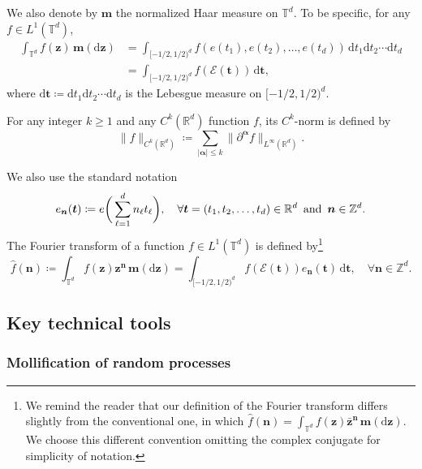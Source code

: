 \documentclass[12pt]{amsart}
\theoremstyle{definition}
\theoremstyle{remark}
\newcommand{\bt}{\boldsymbol{t}}
\newcommand{\bz}{\boldsymbol{z}}
\newcommand{\R}{\mathbb{R}}
\newcommand{\Z}{\mathbb{Z}}
\newcommand{\T}{\mathbb{T}}
\newcommand{\an}{\text{\, and \,}}
\numberwithin{equation}{section}
\begin{document}
We also denote by  $\boldsymbol{m}$ the normalized Haar measure on $\T^d$. To be specific, for any $f\in L^1(\T^d)$,
\begin{align*}
\int_{\T^d} f(\bz)\,\boldsymbol{m}(\mathrm{d}\bz)&=\int_{[-1/2,1/2)^d}f(e(t_1),e(t_2),\ldots,e(t_d))\,\mathrm{d}t_1\mathrm{d}t_2\cdots\mathrm{d}t_d 
\\
& =\int_{[-1/2,1/2)^d}f(\mathcal{E}(\bt))\,\mathrm{d}\bt,
\end{align*}
where $\mathrm{d}\bt\coloneq \mathrm{d}t_1\mathrm{d}t_2\cdots\mathrm{d}t_d$ is the Lebesgue measure on $[-1/2,1/2)^d$.

For any integer $k \ge 1$ and any $C^k(\R^d)$ function $f$, its $C^k$-norm is defined by
\[
\|f\|_{C^k(\R^d)}\coloneq \sum_{|\boldsymbol{\alpha}|\le k}\|\partial^{\boldsymbol{\alpha}}f\|_{L^\infty(\R^d)}.
\]

We also use the standard notation 
\[
e_{\boldsymbol{n}}(\bt)\coloneq e\bigg(\sum_{\ell=1}^d n_\ell t_\ell\bigg),\quad \forall \bt=(t_1,t_2,\ldots,t_d)\in \R^d \an \boldsymbol{n}\in \Z^d.
\]
The Fourier transform of a function $f\in L^1(\T^d)$ is defined by\footnote{We remind the reader that our definition of the Fourier transform differs slightly from the conventional one, in which $\widehat{f}(\boldsymbol{n})=\int_{\T^d} f(\bz)\bar{\bz}^{\boldsymbol{n}}\,\boldsymbol{m}(\mathrm{d}\bz)$. We choose this different convention omitting the complex conjugate for simplicity of notation.}
\[
\widehat{f}(\boldsymbol{n})\coloneq \int_{\T^d} f(\bz)\bz^{\boldsymbol{n}}\,\boldsymbol{m}(\mathrm{d}\bz)=\int_{[-1/2,1/2)^d}f(\mathcal{E}(\bt))e_{\boldsymbol{n}}(\bt)\,\mathrm{d}\bt,\quad \forall \boldsymbol{n}\in \Z^d.
\]

\subsection{Key technical tools}

\subsubsection{Mollification of random processes}
\end{document}

